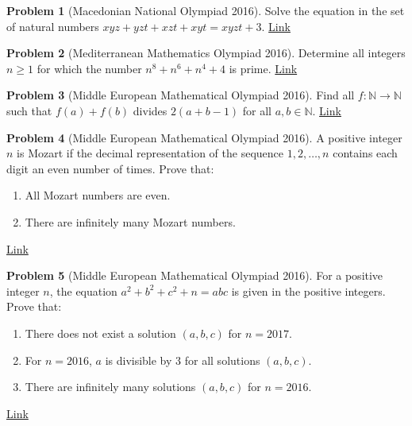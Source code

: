 \documentclass[]{article}
\theoremstyle{definition}
\newtheorem{problem}{Problem}
\begin{document}
\begin{problem}[Macedonian National Olympiad 2016]
	Solve the equation in the set of natural numbers $xyz+yzt+xzt+xyt = xyzt + 3$. \hfill \href{http://artofproblemsolving.com/community/c6h1225109p6154402}{Link}
\end{problem}





\begin{problem}[Mediterranean Mathematics Olympiad 2016]
	Determine all integers $n\ge1$ for which the number $n^8+n^6+n^4+4$ is prime. \hfill \href{http://artofproblemsolving.com/community/c6h1252007p6455074}{Link}
\end{problem}




\begin{problem}[Middle European Mathematical Olympiad 2016]
	Find all $f : \mathbb{N} \to \mathbb{N} $ such that $f(a) + f(b)$ divides $2(a + b - 1)$ for all $a, b \in \mathbb{N}$. \hfill \href{http://artofproblemsolving.com/community/c6h1295282p6869698}{Link}
\end{problem}





\begin{problem}[Middle European Mathematical Olympiad 2016]
	A positive integer $n$ is Mozart if the decimal representation of the sequence $1, 2, \ldots, n$ contains each digit an even number of times.
	Prove that:
		\begin{enumerate}
			\item All Mozart numbers are even.
			\item There are infinitely many Mozart numbers.
		\end{enumerate}
	\flushright \href{http://artofproblemsolving.com/community/c6h1295945p6876321}{Link}
\end{problem}




\begin{problem}[Middle European Mathematical Olympiad 2016]
	For a positive integer $n$, the equation $a^2 + b^2 + c^2 + n = abc$ is given in the positive integers.
	Prove that:
		\begin{enumerate}
			\item There does not exist a solution $(a, b, c)$ for $n = 2017$.
			\item For $n = 2016$, $a$ is divisible by $3$ for all solutions $(a, b, c)$.
			\item There are infinitely many solutions $(a, b, c)$ for $n = 2016$.
		\end{enumerate}
	\flushright \href{http://artofproblemsolving.com/community/c6h1295948p6876344}{Link}
\end{problem}
\end{document}
